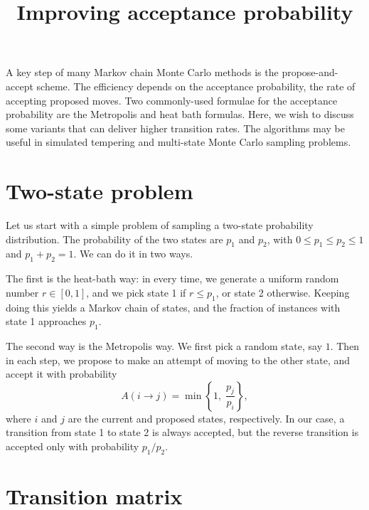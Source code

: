 \documentclass[12pt]{article}
\begin{document}
\title{Improving acceptance probability}
\author{ \vspace{-10ex} }
\date{ \vspace{-10ex} }
\maketitle


A key step of many Markov chain Monte Carlo methods
is the propose-and-accept scheme.
%
The efficiency depends on the acceptance probability,
the rate of accepting proposed moves.
%
Two commonly-used formulae for the acceptance probability
are the Metropolis and heat bath formulas.
%
Here, we wish to discuss some variants
that can deliver higher transition rates.
%
The algorithms may be useful in simulated tempering
and multi-state Monte Carlo sampling problems.


\section{Two-state problem}

Let us start with a simple problem of
sampling a two-state probability distribution.
%
The probability of the two states are $p_1$ and $p_2$,
with $0 \le p_1 \le p_2 \le 1$ and $p_1 + p_2 = 1$.
%
We can do it in two ways.


The first is the heat-bath way:
in every time, we generate a uniform random number $r \in [0, 1]$,
and we pick state 1 if $r \le p_1$, or state 2 otherwise.
%
Keeping doing this yields a Markov chain of states,
and the fraction of instances with state 1 approaches $p_1$.

The second way is the Metropolis way.
We first pick a random state, say $1$.
Then in each step,
we propose to make an attempt of moving to the other state,
and accept it with probability
\begin{equation}
  A(i \rightarrow j) = \min\left\{1, \; \frac{ p_j } { p_i } \right\},
  \label{eq:AMetropolis}
\end{equation}
where $i$ and $j$ are the current and proposed states, respectively.
In our case, a transition from state 1 to state 2 is always accepted,
but the reverse transition is accepted
only with probability $p_1/p_2$.

\section{Transition matrix}
\end{document}
